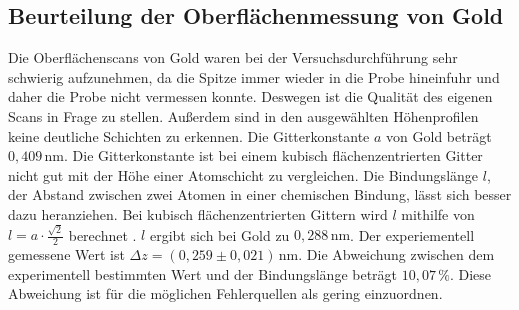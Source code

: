 \subsection{Beurteilung der Oberflächenmessung von Gold}
Die Oberflächenscans von Gold waren bei der Versuchsdurchführung sehr schwierig aufzunehmen, da die Spitze immer wieder in die Probe hineinfuhr und daher die Probe nicht vermessen konnte. Deswegen ist die Qualität des eigenen Scans in Frage zu stellen. Außerdem sind in den ausgewählten Höhenprofilen keine deutliche Schichten zu erkennen. Die Gitterkonstante $a$ von Gold beträgt $0,409 \, \unit{\nano\meter}$. Die Gitterkonstante ist bei einem kubisch flächenzentrierten Gitter nicht gut mit der Höhe einer Atomschicht zu vergleichen. Die Bindungslänge $l$, der Abstand zwischen zwei Atomen in einer chemischen Bindung, lässt sich besser dazu heranziehen. Bei kubisch flächenzentrierten Gittern wird $l$ mithilfe von 
$l = a \cdot \frac{\sqrt{2}}{2}$ berechnet \cite{Bindungslaenge}. $l$ ergibt sich bei Gold zu $0,288 \, \unit{\nano\meter}$. Der experiementell gemessene Wert ist $\Delta z = (0,259 \pm 0,021)\,  \unit{\nano\meter}$. Die Abweichung zwischen dem experimentell bestimmten Wert und der Bindungslänge beträgt $10,07 \, \%$. Diese Abweichung ist für die möglichen Fehlerquellen als gering einzuordnen.
